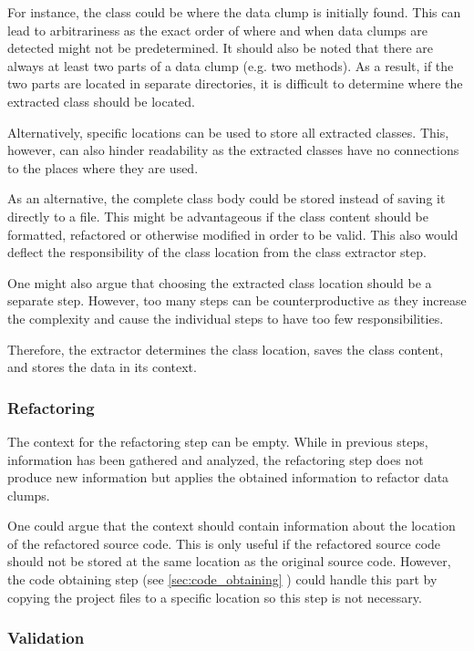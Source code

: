 For instance, the class could be where the data clump is initially found. This can lead to arbitrariness as the exact order of where and when data clumps are detected might not be predetermined. It should also be noted that there are always at least two parts of a data clump (e.g. two methods). As a result, if the two parts are located in separate directories, it is difficult to determine where the extracted class should be located. 

Alternatively, specific locations can be used to store all extracted classes. This, however, can also hinder readability as the extracted classes have no connections to the places where they are used. 

As an alternative, the complete class body could be stored instead of saving it directly to a file. This might be advantageous if the class content should be formatted, refactored or otherwise modified in order to be valid. This also would deflect the responsibility of the class location from the class extractor step. 

One might also argue that choosing the extracted class location should be a separate step. 
However, too many steps can be counterproductive as they increase the complexity and cause the individual steps to have too few responsibilities.

Therefore, the extractor determines the class location, saves the class content, and stores the data in its context. 


\subsubsection{Refactoring}
The context for the refactoring step  can be empty. While in previous steps, information has been gathered and analyzed, the refactoring step does not produce new information but applies the obtained information to refactor data clumps. 

One could argue that the context should contain information about the location of the refactored source code. This is only useful if the refactored source code should not be stored at the same location as the original source code.  However, the code obtaining step (see \ref{sec:code_obtaining}
) could handle this part by copying the project files to a specific location so this step is not necessary. 

\subsubsection{Validation}


